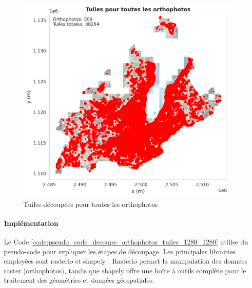 \begin{figure}[H]
    \centering
    \includegraphics[width=1\linewidth]{02-main/figures/ch3/ch3_preparation_donnees_orthophotos_07_exemple_decoupe_orthophoto6.png}
    \caption{Tuiles découpées pour toutes les orthophotos}
    \label{fig:ch3_preparation_donnees_orthophotos_07_exemple_decoupe_orthophoto6}
\end{figure}

\newpage
\paragraph{Implémentation}
Le Code \ref{code:pseudo_code_decoupe_orthophotos_tuiles_1280_1280} utilise du pseudo-code pour expliquer les étapes de découpage. Les principales librairies employées sont rasterio \cite{noauthor_rasterio_nodate} et shapely \cite{noauthor_shapely_nodate}. Rasterio permet la manipulation des données raster (orthophotos), tandis que shapely offre une boîte à outils complète pour le traitement des géométries et données géospatiales.


